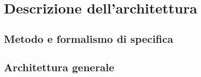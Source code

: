 \documentclass[../SpecificaTecnica.tex]{subfiles}
\begin{document}
\section{Descrizione dell'architettura}
	\subsection{Metodo e formalismo di specifica}
	\subsection{Architettura generale}
\end{document}
